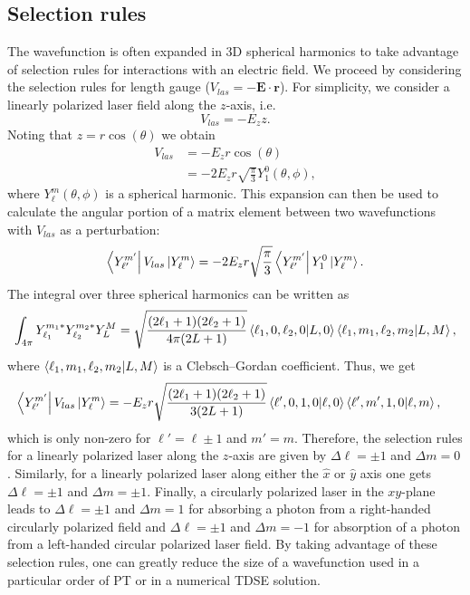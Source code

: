 \subsection{Selection rules} %
\label{sub:selection_rules}
The wavefunction is often expanded in 3D spherical harmonics to take advantage of selection rules for interactions with an electric field. We proceed by considering the selection rules for length gauge ($V_{las}=-\mathbf{E}\cdot \mathbf{r}$). For simplicity, we consider a linearly polarized laser field along the $z$-axis, i.e.
\begin{equation}
    V_{las}=-E_z z.
\end{equation}
Noting that $z=r\cos(\theta)$ we obtain
\begin{align}
    V_{las}&=-E_zr\cos(\theta)\\
    &=-2E_zr\sqrt{\frac{\pi}{3}}Y_1^0(\theta,\phi),
\end{align}
where $Y_\ell^m(\theta,\phi)$ is a spherical harmonic. This expansion can then be used to calculate the angular portion of a matrix element between two wavefunctions with $V_{las}$ as a perturbation: 
\begin{equation}
    \bra{Y_{\ell'}^{m'}}V_{las}\ket{Y_{\ell}^{m}} = -2E_zr\sqrt{\frac{\pi}{3}}\bra{Y_{\ell'}^{m'}}Y_1^0\ket{Y_{\ell}^{m}}.
\end{equation}
The integral over three spherical harmonics can be written as 
\begin{equation}
    \int_{4\pi} Y_{\ell_1}^{m_1*}Y_{\ell_2}^{m_2*}Y_{L}^{M} = \sqrt{\frac{(2\ell_1+1)(2\ell_2+1)}{4\pi(2L+1)}}\bra{\ell_1,0,\ell_2,0}\ket{L,0}\bra{\ell_1,m_1,\ell_2,m_2}\ket{L,M},
\end{equation}
where $\bra{\ell_1,m_1,\ell_2,m_2}\ket{L,M}$ is a Clebsch–Gordan coefficient. Thus, we get
\begin{align}
    \bra{Y_{\ell'}^{m'}}V_{las}\ket{Y_{\ell}^{m}} &= -E_zr\sqrt{\frac{(2\ell_1+1)(2\ell_2+1)}{3(2L+1)}}\bra{\ell',0,1,0}\ket{\ell,0}\bra{\ell',m',1,0}\ket{\ell,m},
\end{align}
which is only non-zero for $\ell' = \ell \pm 1$ and $m'=m$. Therefore, the selection rules for a linearly polarized laser along the $z$-axis are given by $\Delta\ell=\pm1$ and $\Delta m = 0$. Similarly, for a linearly polarized laser along either the $\hat{x}$ or $\hat{y}$ axis one gets $\Delta\ell=\pm1$ and $\Delta m = \pm1$. Finally, a circularly polarized laser in the $xy$-plane leads to $\Delta\ell=\pm1$ and $\Delta m = 1$ for absorbing a photon from a right-handed circularly polarized field and $\Delta\ell=\pm1$ and $\Delta m = -1$ for absorption of a photon from a left-handed circular polarized laser field. By taking advantage of these selection rules, one can greatly reduce the size of a wavefunction used in a particular order of PT or in a numerical TDSE solution.

